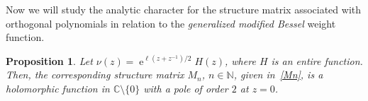 \documentclass[12pt]{amsart}
\newtheorem{proposition}{Proposition}[section]
\newcommand{\dde}{\operatorname e}
\begin{document}
%


Now we will study the analytic character for the structure matrix associated with orthogonal polynomials in relation to the \emph{generalized modified Bessel} weight function.

\begin{proposition}
\label{teo:mnbessel}
Let \( \nu(z)=\dde ^{\ell(z+z^{-1})/2} H(z) \), where \( H \) is an entire function.
Then, the corresponding structure matrix \( M_n \), \( n\in\mathbb{N} \), given in~\eqref{Mn}, is a holomorphic function in \( \mathbb {C}\setminus \{0\}
 \) with a pole of order \( 2 \) at \( z=0 \).
\end{proposition}
\end{document}
